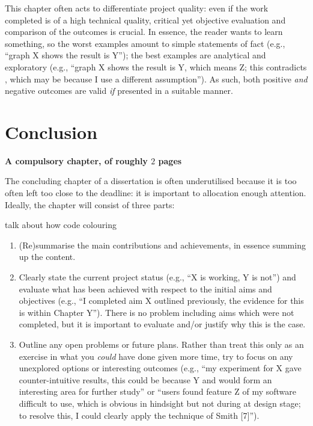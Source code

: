 \documentclass[ %
                    author={Jonathan Rankin},
                supervisor={Dr. David May, Dr. Ian Holyer},
                    degree={MEng},
                     title={CodeTouch},
                  subtitle={A Revolutionary Way To Program Real Code On Touch Screen Devices},
                      type={enterprise},
                      year={2015 } ]{dissertation}
\begin{document}
\noindent
This chapter often acts to differentiate project quality: even if the work
completed is of a high technical quality, critical yet objective evaluation 
and comparison of the outcomes is crucial.  In essence, the reader wants to
learn something, so the worst examples amount to simple statements of fact 
(e.g., ``graph X shows the result is Y''); the best examples are analytical 
and exploratory (e.g., ``graph X shows the result is Y, which means Z; this 
contradicts , which may be because I use a different assumption'').  As 
such, both positive {\em and} negative outcomes are valid {\em if} presented 
in a suitable manner.


\chapter{Conclusion}
\label{chap:conclusion}

{\bf A compulsory chapter, of roughly $2$ pages} 
\vspace{1cm} 

\noindent
The concluding chapter of a dissertation is often underutilised because it 
is too often left too close to the deadline: it is important to allocation
enough attention.  Ideally, the chapter will consist of three parts:

talk about how code colouring

\begin{enumerate}
\item (Re)summarise the main contributions and achievements, in essence
      summing up the content.
\item Clearly state the current project status (e.g., ``X is working, Y 
      is not'') and evaluate what has been achieved with respect to the 
      initial aims and objectives (e.g., ``I completed aim X outlined 
      previously, the evidence for this is within Chapter Y'').  There 
      is no problem including aims which were not completed, but it is 
      important to evaluate and/or justify why this is the case.
\item Outline any open problems or future plans.  Rather than treat this
      only as an exercise in what you {\em could} have done given more 
      time, try to focus on any unexplored options or interesting outcomes
      (e.g., ``my experiment for X gave counter-intuitive results, this 
      could be because Y and would form an interesting area for further 
      study'' or ``users found feature Z of my software difficult to use,
      which is obvious in hindsight but not during at design stage; to 
      resolve this, I could clearly apply the technique of Smith [7]'').
\end{enumerate}
\end{document}
